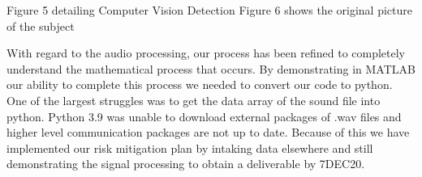 \documentclass[10pt]{article}
\begin{document}
                                              Figure 5 detailing Computer Vision Detection                                   Figure 6 shows the original picture of the subject

With regard to the audio processing, our process has been refined to completely understand the mathematical process that occurs. By demonstrating in MATLAB our ability to complete this process we needed to convert our code to python. One of the largest struggles was to get the data array of the sound file into python. Python 3.9 was unable to download external packages of .wav files and higher level communication packages are not up to date. Because of this we have implemented our risk mitigation plan by intaking data elsewhere and still demonstrating the signal processing to obtain a deliverable by 7DEC20.


%

%
\end{document}

